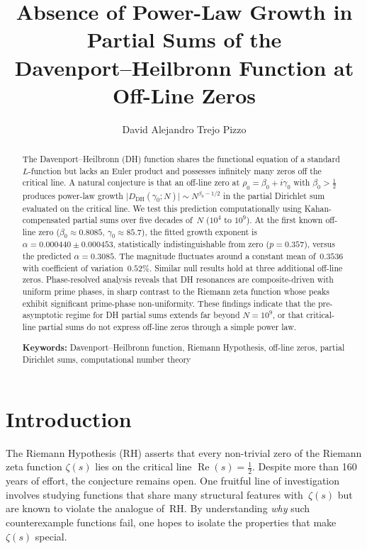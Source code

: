 \documentclass[11pt]{amsart}
\title[A Davenport--Heilbronn Null Result]{Absence of Power-Law Growth in Partial Sums of the\\
Davenport--Heilbronn Function at Off-Line Zeros}
\author{David Alejandro Trejo Pizzo}
\theoremstyle{definition}
\theoremstyle{remark}
\renewcommand{\DH}{\mathrm{DH}}
\newcommand{\re}{\operatorname{Re}}
\begin{document}
\begin{abstract}
The Davenport--Heilbronn (DH) function shares the functional equation
of a standard $L$-function but lacks an Euler product and possesses
infinitely many zeros off the critical line.  A natural conjecture is
that an off-line zero at
$\rho_0 = \beta_0 + i\gamma_0$ with $\beta_0 > \tfrac{1}{2}$
produces power-law growth
$\lvert D_{\DH}(\gamma_0; N)\rvert \sim N^{\beta_0 - 1/2}$
in the partial Dirichlet sum evaluated on the critical line.
We test this prediction computationally using Kahan-compensated partial
sums over five decades of~$N$ ($10^4$ to $10^9$).
At the first known off-line zero
($\beta_0 \approx 0.8085$, $\gamma_0 \approx 85.7$),
the fitted growth exponent is
$\alpha = 0.000440 \pm 0.000453$,
statistically indistinguishable from zero ($p = 0.357$),
versus the predicted $\alpha = 0.3085$.
The magnitude fluctuates around a constant mean of~$0.3536$ with
coefficient of variation~$0.52\%$.
Similar null results hold at three additional off-line zeros.
Phase-resolved analysis reveals that DH resonances are
composite-driven with uniform prime phases, in sharp contrast to the
Riemann zeta function whose peaks exhibit significant prime-phase
non-uniformity.  These findings indicate that the pre-asymptotic regime
for DH partial sums extends far beyond $N = 10^9$, or that
critical-line partial sums do not express off-line zeros through a
simple power law.

\medskip
\noindent
\textbf{Keywords:} Davenport--Heilbronn function, Riemann Hypothesis,
off-line zeros, partial Dirichlet sums, computational number theory
\end{abstract}

\maketitle




\section{Introduction}\label{sec:intro}
The Riemann Hypothesis (RH) asserts that every non-trivial zero of the
Riemann zeta function $\zeta(s)$ lies on the critical line
$\re(s) = \tfrac{1}{2}$.  Despite more than 160 years of effort, the
conjecture remains open.  One fruitful line of investigation involves
studying functions that share many structural features with~$\zeta(s)$
but are known to violate the analogue of~RH.  By understanding
\emph{why} such counterexample functions fail, one hopes to isolate
the properties that make $\zeta(s)$ special.
\end{document}

